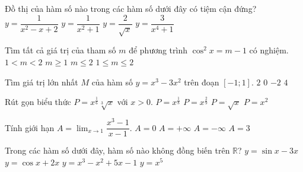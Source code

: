 \begin{ex}%
Đồ thị của hàm số nào trong các hàm số  dưới đây có tiệm cận đứng?
\choice
{$y=\dfrac{1}{x^2-x+2}$}
{$y=\dfrac{1}{x^2+1}$}
{\True $y=\dfrac{2}{\sqrt{x}}$}
{$y=\dfrac{3}{x^4+1}$}
\end{ex}

\begin{ex}%
Tìm tất cả giá trị của tham số $m$ để phương trình $\cos^2x =m-1$ có nghiệm.
\choice
{$1<m<2$}
{$m \geq 1$}
{$m \leq 2$}
{\True $1 \leq m \leq 2$}
\end{ex}

\begin{ex}%
Tìm giá trị lớn nhất $M$ của hàm số $y=x^3-3x^2$ trên đoạn $[-1;1]$. 
\choice
{$2$}
{\True $0$}
{$-2$}
{$4$}
\end{ex}

\begin{ex}%
Rút gọn biểu thức $P =x^{\frac{1}{6}} \sqrt[3]{x}$ với $x>0$.
\choice
{$P=x^{\frac{1}{8}}$}
{$P=x^{\frac{2}{9}}$}
{\True $P=\sqrt{x}$}
{$P=x^2$}
\end{ex}


\begin{ex}%
Tính giới hạn $\displaystyle A=\lim_{x \to 1} \dfrac{x^3-1}{x-1}$.
\choice
{$A=0$}
{$A=+\infty$}
{$A=-\infty$}
{\True $A=3$}
\end{ex}

\begin{ex}%
Trong các hàm số dưới đây, hàm số nào không đồng biến trên $\mathbb{R}$?
\choice
{\True $y=\sin x -3x$}
{$y=\cos x +2x$}
{$y=x^3-x^2+5x-1$}
{$y=x^5$}
\end{ex}

